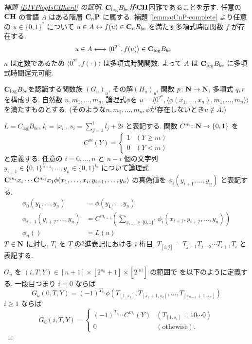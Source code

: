 \begin{proof}[\rm 補題 \ref{DIVPlogIsCHhard} の証明]
 $\mathbf{C}_{\log} B_{be}$が$\mathbf{CH}$困難であることを示す.
 任意の $\mathbf{CH}$ の言語 $A$ はある階層 $\mathbf{C}_n \mathbf{P}$ に属する. 
 補題 \ref{lemma:CnP-complete} より任意の $u \in \{0,1\}^*$ について
 $u \in A \leftrightarrow f(u) \in \mathbf{C}_n B_{be}$ 
 を満たす多項式時間関数 $f$ が存在する.
 \begin{align}
  u \in A 
  & \longleftrightarrow \langle 0^{2^n}, f(u) \rangle \in \mathbf{C}_{\log} B_{be}
 \end{align}
 $n$ は定数であるため $\langle 0^{2^n}, f(\cdot) \rangle$ は多項式時間関数.
 よって $A$ は $\mathbf{C}_{\log} B_{be}$ に多項式時間還元可能.


 $\mathbf{C}_{\log} B_{be}$を認識する関数族 $(G_u)_u$, 
 その解$(H_u)_u$, 関数 $p \colon \mathbf N \to \mathbf N$, 多項式 $q,r$ を構成する.
 自然数 $n, m_1, \dots, m_n$, 論理式$\phi$を
 $u  = \langle 0^{2^n}, 
 \langle \phi(x_1, \dots, x_n), m_1, \dots, m_n \rangle \rangle$
 を満たすものとする. 
 (そのような$n, m_1, \dots, m_n, \phi$が存在しないとき$u \not \in A$.)
 
 
 $L = C_{\log} B_{be}$,
 $l_i = |x_i|$,
 $s_i = \sum^i_{j=1}l_j + 2i$  と表記する.
 関数 $C^m \colon \mathbf N \to \{0,1\}$ を
 \begin{equation}
  C^m(Y) 
     = \begin{cases}
       1 & (Y \ge m) \\
       0 & (Y < m) \end{cases}
 \end{equation}
 と定義する. 
 任意の $i = 0, \dots, n$ と $n-i$ 個の文字列 
 $y_{i+1} \in \{0,1\}^{l_{i+1}}, \dots, y_n \in \{0,1\}^{l_n}$ 
 について論理式
 $\mathbf{C}^{m_{i}}{x_i} \cdots \mathbf{C}^{m_1}{x_1}
 \phi(x_1, \dots, x_i, y_{i+1}, \dots, y_n)$
 の真偽値を $\phi_i(y_{i+1}, \dots, y_n)$ と表記する.
 \begin{align}
  \phi_0 (y_1, \dots, y_n) &= \phi(y_1, \dots, y_n)
  \\ \label{eq:phi-step}
  \phi_{i+1}(y_{i+2}, \dots, y_n) 
  &= C^{m_{i+1}}\left(\sum\nolimits_{x_{i+1} \in \{0,1\}^{l_i}} 
  \phi_i(x_{i+1}, y_{i+2}, \dots, y_{n})\right) 
  \\
  \phi_n() &= L(u) 
 \end{align}
 $T \in \mathbf N$ に対し, $T_i$ を $T$ の2進表記における $i$ 桁目, 
 $T_{[i,j]} = T_{j-1} T_{j-2} \cdots T_{i+1} T_{i}$ と表記する.


 $G_u$ を $(i, T, Y) \in [n+1] \times [2^{s_n}+1] \times [2^{|u|}]$ の範囲で
 を以下のように定義する. 一段目つまり $i=0$ ならば
 \begin{equation}
  G_u(0,T,Y) = 
   (-1)^{T_{s_1}}\phi(T_{[1,s_1]}, T_{[s_1+1,s_2]},
    \dots, T_{[s_{n-1}+1,s_n]}) 
 \end{equation}
 $i \ge 1$ ならば
 \begin{equation} \label{eq:def-Gu:case0}
  G_u(i,T,Y) = 
   \begin{cases}
    (-1)^{T_{s_{i+1}}} C^{m_i}(Y) 
    & (T_{[1,s_i]} = 10 \cdots 0) \\
    0 & (\text{othewise}).
   \end{cases} 
 \end{equation}



\end{proof}
